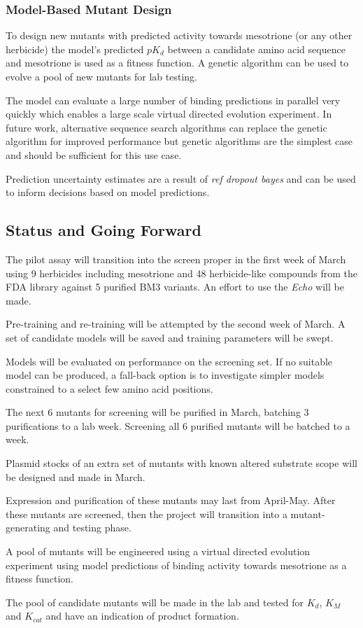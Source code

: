\documentclass{article}
\begin{document}
\subsubsection{Model-Based Mutant Design}
To design new mutants with predicted activity towards mesotrione (or any other herbicide) the model's predicted $pK_d$ between a candidate amino acid sequence and mesotrione is used as a fitness function. A genetic algorithm can be used to evolve a pool of new mutants for lab testing. %
\par
The model can evaluate a large number of binding predictions in parallel very quickly which enables a large scale virtual directed evolution experiment. In future work, alternative sequence search algorithms can replace the genetic algorithm for improved performance but genetic algorithms are the simplest case and should be sufficient for this use case. %
\par
Prediction uncertainty estimates are a result of \textit{ref dropout bayes} and can be used to inform decisions based on model predictions. %

\subsection{Status and Going Forward}
The pilot assay will transition into the screen proper in the first week of March using 9 herbicides including mesotrione and 48 herbicide-like compounds from the FDA library against 5 purified BM3 variants. An effort to use the \textit{Echo} will be made. %
\par
Pre-training and re-training will be attempted by the second week of March. A set of candidate models will be saved and training parameters will be swept. %
\par
Models will be evaluated on performance on the screening set. If no suitable model can be produced, a fall-back option is to investigate simpler models constrained to a select few amino acid positions. %
\par
The next 6 mutants for screening will be purified in March, batching 3 purifications to a lab week. Screening all 6 purified mutants will be batched to a week. %
\par
Plasmid stocks of an extra set of mutants with known altered substrate scope will be designed and made in March. %
\par
Expression and purification of these mutants may last from April-May. After these mutants are screened, then the project will transition into a mutant-generating and testing phase. 
\par
A pool of mutants will be engineered using a virtual directed evolution experiment using model predictions of binding activity towards mesotrione as a fitness function. 
\par
The pool of candidate mutants will be made in the lab and tested for $K_d$, $K_M$ and $K_{cat}$ and have an indication of product formation.
\end{document}
